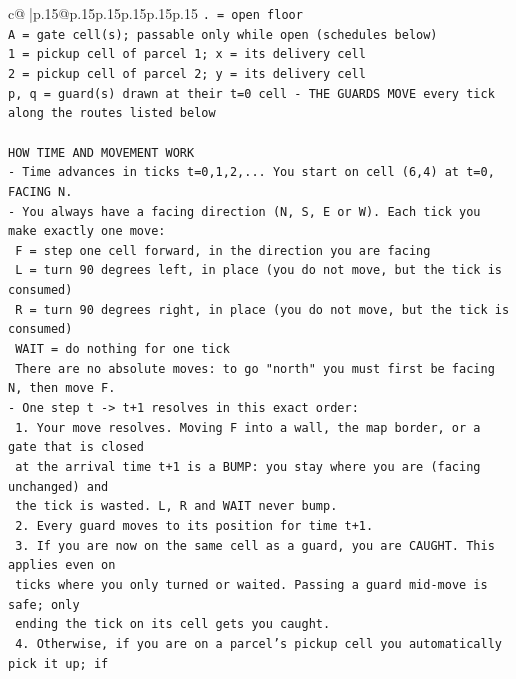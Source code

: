 \documentclass{article}
\begin{document}
{\begin{supertabular}{c@{$\;$}|p{.15\linewidth}@{}p{.15\linewidth}p{.15\linewidth}p{.15\linewidth}p{.15\linewidth}p{.15\linewidth}}
{{{\texttt{. = open floor} \\
\texttt{A = gate cell(s); passable only while open (schedules below)} \\
\texttt{1 = pickup cell of parcel 1; x = its delivery cell} \\
\texttt{2 = pickup cell of parcel 2; y = its delivery cell} \\
\texttt{p, q = guard(s) drawn at their t=0 cell {-} THE GUARDS MOVE every tick along the routes listed below} \\
\\ 
\texttt{HOW TIME AND MOVEMENT WORK} \\
\texttt{{-} Time advances in ticks t=0,1,2,... You start on cell (6,4) at t=0, FACING N.} \\
\texttt{{-} You always have a facing direction (N, S, E or W). Each tick you make exactly one move:} \\
\texttt{  F    = step one cell forward, in the direction you are facing} \\
\texttt{  L    = turn 90 degrees left, in place (you do not move, but the tick is consumed)} \\
\texttt{  R    = turn 90 degrees right, in place (you do not move, but the tick is consumed)} \\
\texttt{  WAIT = do nothing for one tick} \\
\texttt{  There are no absolute moves: to go "north" you must first be facing N, then move F.} \\
\texttt{{-} One step t {-}> t+1 resolves in this exact order:} \\
\texttt{  1. Your move resolves. Moving F into a wall, the map border, or a gate that is closed} \\
\texttt{     at the arrival time t+1 is a BUMP: you stay where you are (facing unchanged) and} \\
\texttt{     the tick is wasted. L, R and WAIT never bump.} \\
\texttt{  2. Every guard moves to its position for time t+1.} \\
\texttt{  3. If you are now on the same cell as a guard, you are CAUGHT. This applies even on} \\
\texttt{     ticks where you only turned or waited. Passing a guard mid{-}move is safe; only} \\
\texttt{     ending the tick on its cell gets you caught.} \\
\texttt{  4. Otherwise, if you are on a parcel's pickup cell you automatically pick it up; if} \\
}}}
\end{supertabular}}
\end{document}
